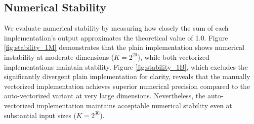\documentclass[10pt]{report}
\begin{document}
\subsection*{Numerical Stability}
We evaluate numerical stability by measuring how closely the sum of each implementation's output approximates the theoretical value of 1.0. Figure \ref{fig:stability_1M} demonstrates that the plain implementation shows numerical instability at moderate dimensions ($K = 2^{20}$), while both vectorized implementations maintain stability. Figure \ref{fig:stability_1B}, which excludes the significantly divergent plain implementation for clarity, reveals that the manually vectorized implementation achieves superior numerical precision compared to the auto-vectorized variant at very large dimensions. Nevertheless, the auto-vectorized implementation maintains acceptable numerical stability even at substantial input sizes ($K=2^{30}$).
\end{document}
